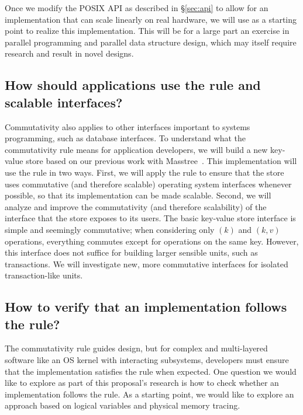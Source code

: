 Once we modify the POSIX API as described in \S\ref{sec:api} to
allow for an implementation that can scale linearly on real hardware,
we will use \sys as a starting point to realize this implementation.
This will be for a large part an exercise in parallel programming and
parallel data structure design, which may
itself require research and result in novel designs.

\begin{comment}
The downside of using \sys is that we will miss features that are
important (e.g., swapping) and for which a scalable implementation is
challenging (e.g., swapping needs a reverse map).  Our hope is that
we will learn enough from the xv6 subsystems that those lessons can be
carried over to subsystems that xv6 won't support.
\end{comment}


\subsection{How should applications use the rule and scalable interfaces?}

Commutativity also applies to other interfaces important to
systems programming, such as database interfaces.
%
 To understand what the commutativity rule means for application
developers, we will build a new key-value store based on our previous
work with Masstree~\cite{mao:masstree}.  This implementation will
use the rule in two ways.  First, we will apply the rule to ensure
that the store uses commutative (and therefore scalable) operating
system interfaces whenever possible, so that its
implementation can be made scalable.  Second, we will analyze and improve the
commutativity (and therefore scalability) of the interface that the
store exposes to its users.
%
The basic key-value store interface is simple and seemingly commutative;
when considering only $(k)$ and $(k, v)$ operations,
everything commutes except for operations on the same key.
%
However, this interface does not suffice for building larger sensible
units, such as transactions.
%
We will investigate new, more commutative interfaces for isolated
transaction-like units.


\subsection{How to verify that an implementation follows the rule?}

The commutativity rule guides design, but for complex and multi-layered
software like an OS kernel with interacting subsystems, developers must
ensure that the implementation satisfies the rule when expected.
One question we would like to explore as part of this proposal's research
is how to check whether an implementation follows the rule.  As a starting
point, we would like to explore an approach based on logical variables
and physical memory tracing.

